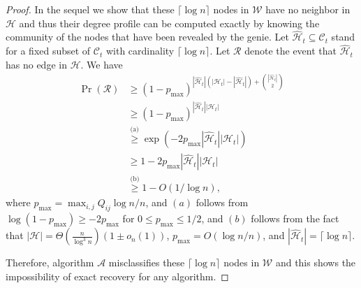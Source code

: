 \documentclass[11pt]{article}
\theoremstyle{plain}
\theoremstyle{definition}
\begin{document}
\begin{proof}
In the sequel we show that these $\lceil \log n \rceil$ nodes in $\mathcal{W}$
have no neighbor in $\mathcal{H}$ and thus their degree profile
can be computed exactly by knowing the community of the
nodes that have been revealed by the genie. 
Let $\hat{\mathcal{H}}_t \subseteq \mathcal{C}_t$ stand for
a fixed subset of $\mathcal{C}_t$ with cardinality $\lceil \log n \rceil$. Let $\mathcal{R}$ denote the event that
$\hat{\mathcal{H}}_t$ has no edge in $\mathcal{H}$. We have
\begin{align*}
\Pr(\mathcal{R}) & \ge 
(1-p_{\text{max}} )^{|\hat{\mathcal{H}}_t| (  |\mathcal{H}_t| - |\hat{\mathcal{H}}_t|) +{|\hat{\mathcal{H}}_t| \choose 2}} \\
&\ge
(1-p_{\text{max}})^{|\hat{\mathcal{H}}_t|   |\mathcal{H}_t| } \\
& \overset{\text{(a)}}{\ge}
\exp\left(- 2 p_{\max}   |\hat{\mathcal{H}}_t|   |\mathcal{H}_t|\right) \\
&\geq 1- 2 p_{\max}   |\hat{\mathcal{H}}_t|   |\mathcal{H}_t|\\
& \overset{\text{(b)}}{\ge}
1 -O (1/\log n),
\end{align*}
where $p_{\max} =\max_{i,j} Q_{ij} \log n /n$, and
$(a)$ follows from 
$\log(1-p_{\max}) \ge -2 p_{\max}$ for $0 \le p_{\max} \le 1/2$,
and $(b)$ follows from the fact that 
$|\mathcal{H}| = \Theta(\frac{n}{\log^3 n} )(1 \pm o_n(1))$,
$p_{\max} = O(\log n /n)$, and $|\hat{\mathcal{H}}_t| = \lceil \log n \rceil$.

Therefore, algorithm
$\mathscr{A}$ misclassifies these $\lceil \log n \rceil$ nodes in $\mathcal{W}$ and this shows the impossibility
of exact recovery for any algorithm.

\end{proof}
\end{document}
